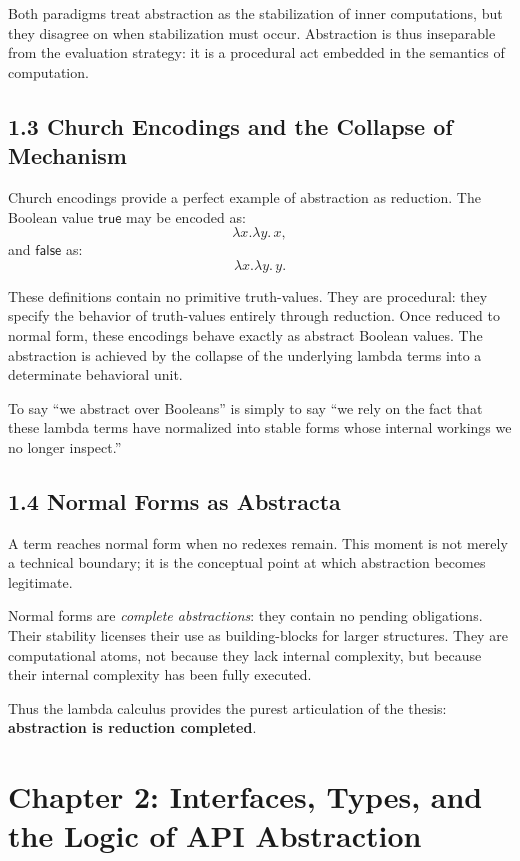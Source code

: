 \documentclass[12pt,letterpaper]{article}
\begin{document}
Both paradigms treat abstraction as the stabilization of inner computations, but they disagree on when stabilization must occur. Abstraction is thus inseparable from the evaluation strategy: it is a procedural act embedded in the semantics of computation.

\subsection{1.3 Church Encodings and the Collapse of Mechanism}

Church encodings provide a perfect example of abstraction as reduction. The Boolean value \(\mathsf{true}\) may be encoded as:
\[
\lambda x.\lambda y.\, x,
\]
and \(\mathsf{false}\) as:
\[
\lambda x.\lambda y.\, y.
\]

These definitions contain no primitive truth-values. They are procedural: they specify the behavior of truth-values entirely through reduction. Once reduced to normal form, these encodings behave exactly as abstract Boolean values. The abstraction is achieved by the collapse of the underlying lambda terms into a determinate behavioral unit.

To say “we abstract over Booleans” is simply to say “we rely on the fact that these lambda terms have normalized into stable forms whose internal workings we no longer inspect.”

\subsection{1.4 Normal Forms as Abstracta}

A term reaches normal form when no redexes remain. This moment is not merely a technical boundary; it is the conceptual point at which abstraction becomes legitimate.

Normal forms are \emph{complete abstractions}: they contain no pending obligations. Their stability licenses their use as building-blocks for larger structures. They are computational atoms, not because they lack internal complexity, but because their internal complexity has been fully executed.

Thus the lambda calculus provides the purest articulation of the thesis: \textbf{abstraction is reduction completed}.

\newpage

\section{Chapter 2: Interfaces, Types, and the Logic of API Abstraction}
\end{document}

